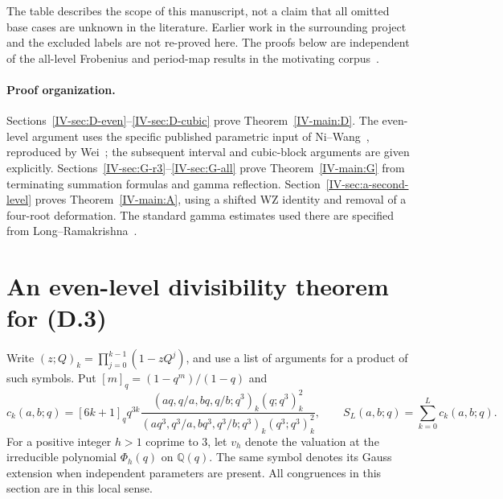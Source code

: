 \documentclass[11pt,letterpaper]{article}
\numberwithin{equation}{section}
\begin{document}
The table describes the scope of this manuscript, not a claim that
all omitted base cases are unknown in the literature. Earlier work in
the surrounding project and the excluded labels are not re-proved here.
The proofs below are independent of the all-level Frobenius
and period-map results in the motivating corpus~\cite{IV-Corpus}.

\paragraph{Proof organization.}
Sections~\ref{IV-sec:D-even}--\ref{IV-sec:D-cubic} prove Theorem~\ref{IV-main:D}.
The even-level argument uses the specific published parametric input
of Ni--Wang~\cite{IV-NiWang}, reproduced by Wei~\cite{IV-Wei}; the subsequent
interval and cubic-block arguments are given explicitly.
Sections~\ref{IV-sec:G-r3}--\ref{IV-sec:G-all} prove Theorem~\ref{IV-main:G}
from terminating summation formulas and gamma reflection.
Section~\ref{IV-sec:a-second-level} proves Theorem~\ref{IV-main:A}, using a
shifted WZ identity and removal of a four-root deformation.
The standard gamma estimates used there are specified from
Long--Ramakrishna~\cite{IV-LongRamakrishna}.

\section{An even-level divisibility theorem for (D.3)}\label{loc-IV-2}
\label{IV-sec:D-even}
Write $(z;Q)_k=\prod_{j=0}^{k-1}(1-zQ^j)$, and use a list of
arguments for a product of such symbols.  Put $[m]_q=(1-q^m)/(1-q)$ and
\[
 c_k(a,b;q)=[6k+1]_q q^{3k}
 \frac{(aq,q/a,bq,q/b;q^3)_k(q;q^3)_k^2}
 {(aq^3,q^3/a,bq^3,q^3/b;q^3)_k(q^3;q^3)_k^2},
 \qquad S_L(a,b;q)=\sum_{k=0}^L c_k(a,b;q).
\]
For a positive integer $h>1$ coprime to $3$, let $v_h$ denote the
valuation at the irreducible polynomial $\Phi_h(q)$ on $\mathbb Q(q)$.
The same symbol denotes its Gauss extension when independent parameters
are present.  All congruences in this section are in this local sense.
\end{document}
